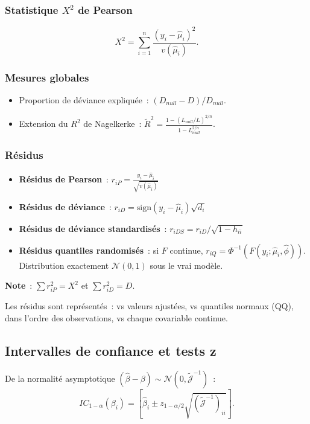 \documentclass[11pt,letterpaper]{article}
\begin{document}
\subsubsection{Statistique $X^2$ de Pearson}
$$X^2 = \sum_{i=1}^n \frac{(y_i - \hat{\mu}_i)^2}{v(\hat{\mu}_i)}.$$

\subsubsection{Mesures globales}
\begin{itemize}
\item Proportion de déviance expliquée~: $(D_{null} - D)/D_{null}$.
\item Extension du $R^2$ de Nagelkerke~: $\widetilde{R}^2 = \frac{1 - (L_{null}/L)^{2/n}}{1 - L_{null}^{2/n}}$.
\end{itemize}

\subsubsection{Résidus}
\begin{itemize}
\item \textbf{Résidus de Pearson}~: $r_{iP} = \frac{y_i - \hat{\mu}_i}{\sqrt{v(\hat{\mu}_i)}}$
\item \textbf{Résidus de déviance}~: $r_{iD} = \text{sign}(y_i - \hat{\mu}_i)\sqrt{d_i}$
\item \textbf{Résidus de déviance standardisés}~: $r_{iDS} = r_{iD}/\sqrt{1-h_{ii}}$
\item \textbf{Résidus quantiles randomisés}~: si $F$ continue, $r_{iQ} = \Phi^{-1}(F(y_i; \hat{\mu}_i, \hat{\phi}))$. Distribution exactement $\mathcal{N}(0,1)$ sous le vrai modèle.
\end{itemize}

\textbf{Note}~: $\sum r_{iP}^2 = X^2$ et $\sum r_{iD}^2 = D$.

Les résidus sont représentés~: vs valeurs ajustées, vs quantiles normaux (QQ), dans l'ordre des observations, vs chaque covariable continue.

\subsection{Intervalles de confiance et tests z}

De la normalité asymptotique $(\hat{\beta} - \beta) \sim \mathcal{N}(0, \tilde{\mathcal{J}}^{-1})$~:
$$IC_{1-\alpha}(\beta_i) = \left[\hat{\beta}_i \pm z_{1-\alpha/2} \sqrt{(\tilde{\mathcal{J}}^{-1})_{ii}}\right].$$
\end{document}

